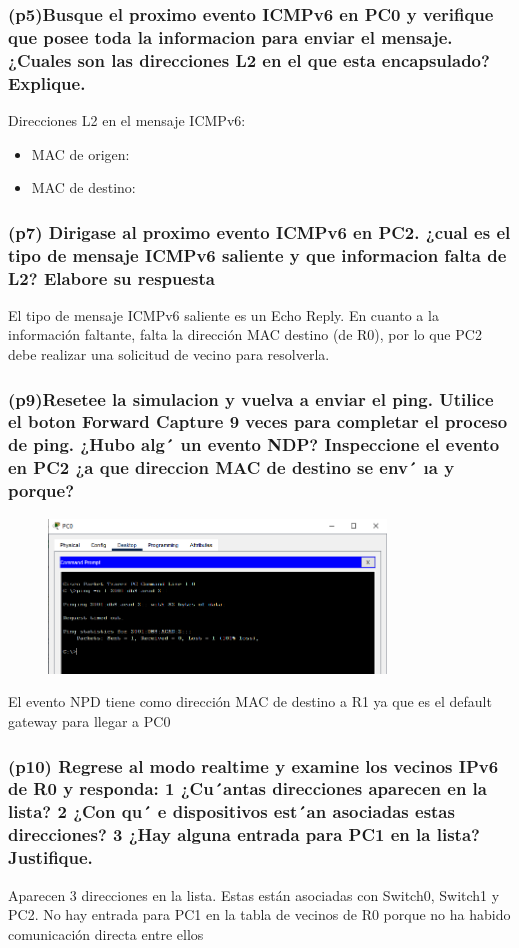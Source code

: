 \documentclass{article}
\begin{document}
\subsubsection*{(p5)Busque el proximo evento ICMPv6 en PC0 y verifique que posee toda la informacion para enviar el mensaje. ¿Cuales son las direcciones L2 en el que esta encapsulado? Explique.}
Direcciones L2 en el mensaje ICMPv6:

\begin{itemize}
    \item MAC de origen: 
    \item MAC de destino: 
\end{itemize}

\subsubsection*{(p7) Dirigase al proximo evento ICMPv6 en PC2. ¿cual es el tipo de mensaje ICMPv6 saliente y que informacion falta de L2? Elabore su respuesta}
El tipo de mensaje ICMPv6 saliente es un Echo Reply. En cuanto a la información faltante, falta la dirección MAC destino (de R0), por lo que PC2 debe realizar una solicitud de vecino para resolverla.

\subsubsection*{(p9)Resetee la simulacion y vuelva a enviar el ping. Utilice el boton Forward Capture 9 veces para completar el proceso de ping. ¿Hubo alg´ un evento NDP? Inspeccione el evento en PC2 ¿a que direccion MAC de destino se env´ ıa y porque?}
\begin{figure}[h]
    \centering
    \includegraphics[width=0.8\textwidth]{22.png}
\end{figure}
El evento NPD tiene como dirección MAC de destino a R1 ya que es el default gateway para llegar a PC0

\subsubsection*{(p10) Regrese al modo realtime y examine los vecinos IPv6 de R0 y responda:
 1 ¿Cu´antas direcciones aparecen en la lista?
 2 ¿Con qu´ e dispositivos est´an asociadas estas direcciones?
 3 ¿Hay alguna entrada para PC1 en la lista? Justifique.}
Aparecen 3 direcciones en la lista. Estas están asociadas con Switch0, Switch1 y PC2. No hay entrada para PC1 en la tabla de vecinos de R0 porque no ha habido comunicación directa entre ellos
\end{document}

